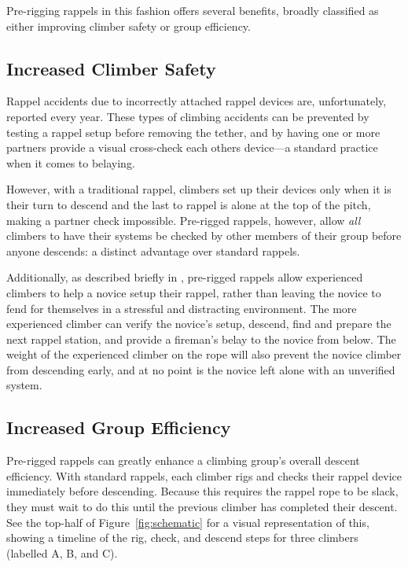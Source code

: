 \documentclass[nonacm,acmtog]{acmart}
\begin{document}
  Pre-rigging rappels in this fashion offers several benefits, broadly
  classified as either improving climber safety or group efficiency.

\subsection{Increased Climber Safety}

  Rappel accidents due to incorrectly attached rappel devices are,
  unfortunately, reported every year.  These types of climbing accidents can be
  prevented by testing a rappel setup before removing the tether, and by having
  one or more partners provide a visual cross-check each others device---a
  standard practice when it comes to belaying.

  However, with a traditional rappel, climbers set up their devices only when
  it is their turn to descend and the last to rappel is alone at the top of the
  pitch, making a partner check impossible.  Pre-rigged rappels, however, allow
  {\em all} climbers to have their systems be checked by other members of their
  group before anyone descends: a distinct advantage over standard rappels.

  Additionally, as described briefly in , pre-rigged rappels
  allow experienced climbers to help a novice setup their rappel, rather than
  leaving the novice to fend for themselves in a stressful and distracting
  environment.  The more experienced climber can verify the novice's setup,
  descend, find and prepare the next rappel station, and provide a fireman's
  belay to the novice from below.  The weight of the experienced climber on the
  rope will also prevent the novice climber from descending early, and at no
  point is the novice left alone with an unverified system.

\subsection{Increased Group Efficiency}
\label{sec:efficiency}

  Pre-rigged rappels can greatly enhance a climbing group's overall descent
  efficiency.  With standard rappels, each climber rigs and checks their rappel
  device immediately before descending.  Because this requires the rappel rope
  to be slack, they must wait to do this until the previous climber has
  completed their descent.  See the top-half of Figure~\ref{fig:schematic} for
  a visual representation of this, showing a timeline of the rig, check, and
  descend steps for three climbers (labelled A, B, and C).
\end{document}
